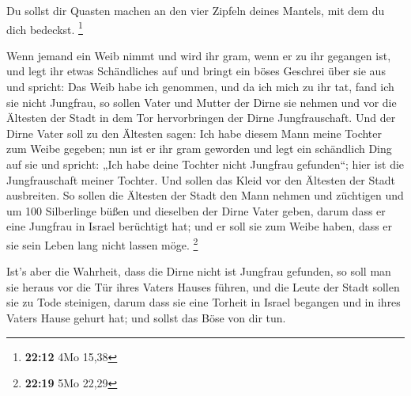  Du sollst dir Quasten machen an den vier Zipfeln deines
Mantels, mit dem du dich bedeckst. \footnote{\textbf{22:12} 4Mo 15,38}

 Wenn jemand ein Weib nimmt und wird ihr gram, wenn er zu
ihr gegangen ist,  und legt ihr etwas Schändliches auf und
bringt ein böses Geschrei über sie aus und spricht: Das Weib habe ich
genommen, und da ich mich zu ihr tat, fand ich sie nicht Jungfrau,
 so sollen Vater und Mutter der Dirne sie nehmen und vor
die Ältesten der Stadt in dem Tor hervorbringen der Dirne
Jungfrauschaft.  Und der Dirne Vater soll zu den Ältesten
sagen: Ich habe diesem Mann meine Tochter zum Weibe gegeben; nun ist er
ihr gram geworden  und legt ein schändlich Ding auf sie und
spricht: „Ich habe deine Tochter nicht Jungfrau gefunden``; hier ist die
Jungfrauschaft meiner Tochter. Und sollen das Kleid vor den Ältesten der
Stadt ausbreiten.  So sollen die Ältesten der Stadt den
Mann nehmen und züchtigen  und um 100 Silberlinge büßen und
dieselben der Dirne Vater geben, darum dass er eine Jungfrau in Israel
berüchtigt hat; und er soll sie zum Weibe haben, dass er sie sein Leben
lang nicht lassen möge. \footnote{\textbf{22:19} 5Mo 22,29}

 Ist's aber die Wahrheit, dass die Dirne nicht ist Jungfrau
gefunden,  so soll man sie heraus vor die Tür ihres Vaters
Hauses führen, und die Leute der Stadt sollen sie zu Tode steinigen,
darum dass sie eine Torheit in Israel begangen und in ihres Vaters Hause
gehurt hat; und sollst das Böse von dir tun.

